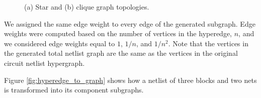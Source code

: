 \begin{figure}[!htbp]
\centering
{}
\caption{(a) Star and (b) clique graph topologies.}
\label{fig:star_clique}
\end{figure}

We assigned the same edge weight to every edge of the generated subgraph. Edge weights were computed based on the number of vertices in the hyperedge, $n$, and we considered edge weights equal to $1$, $1/n$, and $1/n^2$. Note that the vertices in the generated total netlist graph are the same as the vertices in the original circuit netlist hypergraph.

Figure \ref{fig:hyperedge_to_graph} shows how a netlist of three blocks and two nets is transformed into its component subgraphs.

